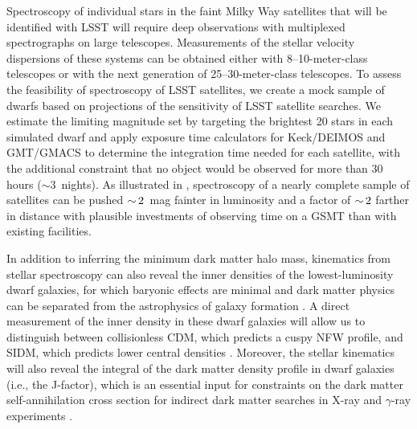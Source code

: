 Spectroscopy of individual stars in the faint Milky Way satellites that will be identified with LSST will require deep observations with multiplexed spectrographs on large telescopes.  Measurements of the stellar velocity dispersions of these systems can be obtained either with 8--10-meter-class telescopes or with the next generation of 25--30-meter-class telescopes.  To assess the feasibility of spectroscopy of LSST satellites, we create a mock sample of dwarfs based on projections of the sensitivity of LSST satellite searches. We estimate the limiting magnitude set by targeting the brightest 20 stars in each simulated dwarf and apply exposure time calculators for Keck/DEIMOS and GMT/GMACS to determine the integration time needed for each satellite, with the additional constraint that no object would be observed for more than 30 hours ($\sim3$~nights).
As illustrated in , spectroscopy of a nearly complete sample of satellites can be pushed $ {\sim}\, 2$~mag fainter in luminosity and a factor of $ {\sim}\, 2$ farther in distance with plausible investments of observing time on a GSMT than with existing facilities.

In addition to inferring the minimum dark matter halo mass, kinematics from stellar spectroscopy can also reveal the inner densities of the lowest-luminosity dwarf galaxies, for which baryonic effects are minimal and dark matter physics can be separated from the astrophysics of galaxy formation \citep{governato2012,read2017}.  A direct measurement of the inner density in these dwarf galaxies will allow us to distinguish between collisionless CDM,  which predicts a cuspy NFW profile, and SIDM, which predicts lower central densities \citep[][though see \citealt{Nishikawa:2019lsc}]{2012MNRAS.423.3740V,Rocha:2012jg}. Moreover, the stellar kinematics will also reveal the integral of the dark matter density profile in dwarf galaxies (i.e., the J-factor), which is an essential input for constraints on the dark matter self-annihilation cross section for indirect dark matter searches in X-ray and $\gamma$-ray experiments \citep[\eg,][]{1108.3546}.

